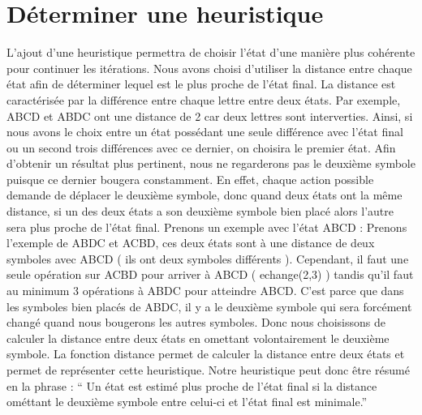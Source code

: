 \documentclass[a4paper,10pt]{report}
\begin{document}
  \section{Déterminer une heuristique}
  L’ajout d’une heuristique permettra de choisir l’état d’une manière plus cohérente pour continuer les itérations. Nous avons choisi d’utiliser la distance entre chaque état afin de déterminer lequel est le plus proche de l’état final. La distance est caractérisée par la différence entre chaque lettre entre deux états. Par exemple, ABCD et ABDC ont une distance de 2 car deux lettres sont interverties. 
Ainsi, si nous avons le choix entre un état possédant une seule différence avec l’état final ou un second trois différences avec ce dernier, on choisira le premier état.
Afin d’obtenir un résultat plus pertinent, nous ne regarderons pas le deuxième symbole puisque ce dernier bougera constamment.\newline
En effet, chaque action possible demande de déplacer le deuxième symbole, donc quand deux états ont la même distance, si un des deux états a son deuxième symbole bien placé
alors l'autre sera plus proche de l'état final. Prenons un exemple avec l'état ABCD : \newline
Prenons l'exemple de ABDC et ACBD, ces deux états sont à une distance de deux symboles avec ABCD ( ils ont deux symboles différents ). Cependant, il faut une seule opération
sur ACBD pour arriver à ABCD ( echange(2,3) ) tandis qu'il faut au minimum 3 opérations à ABDC pour atteindre ABCD. C'est parce que dans les symboles bien placés de 
ABDC, il y a le deuxième symbole qui sera forcément changé quand nous bougerons les autres symboles.\newline
Donc nous choisissons de calculer la distance entre deux états en omettant volontairement le deuxième symbole.
La fonction distance permet de calculer la distance entre deux états et permet de représenter cette heuristique.
Notre heuristique peut donc être résumé en la phrase :
`` Un état est estimé plus proche de l'état final si la distance ométtant le deuxième symbole entre celui-ci et l'état final est minimale.''
  
  
\end{document}
